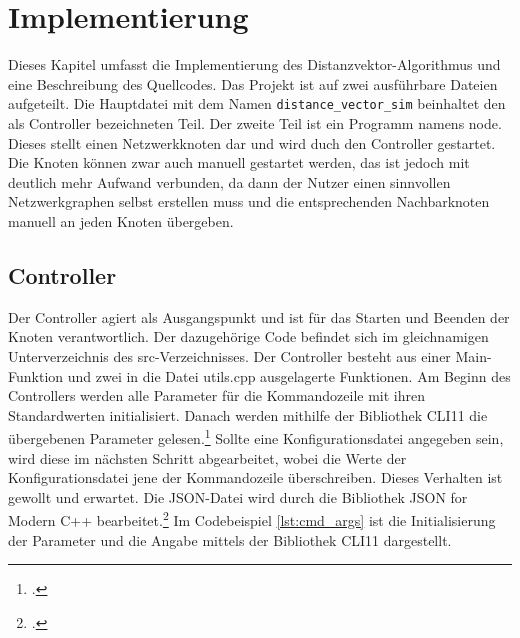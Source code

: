 \chapter{Implementierung}
Dieses Kapitel umfasst die Implementierung des Distanzvektor-Algorithmus und eine Beschreibung des Quellcodes. Das Projekt ist auf zwei ausführbare Dateien aufgeteilt. Die Hauptdatei mit dem Namen \verb|distance_vector_sim| beinhaltet den als Controller bezeichneten Teil. Der zweite Teil ist ein Programm namens node. Dieses stellt einen Netzwerkknoten dar und wird duch den Controller gestartet. Die Knoten können zwar auch manuell gestartet werden, das ist jedoch mit deutlich mehr Aufwand verbunden, da dann der Nutzer einen sinnvollen Netzwerkgraphen selbst erstellen muss und die entsprechenden Nachbarknoten manuell an jeden Knoten übergeben.

\section{Controller}
Der Controller agiert als Ausgangspunkt und ist für das Starten und Beenden der Knoten verantwortlich. Der dazugehörige Code befindet sich im gleichnamigen Unterverzeichnis des src-Verzeichnisses. Der Controller besteht aus einer Main-Funktion und zwei in die Datei utils.cpp ausgelagerte Funktionen. Am Beginn des Controllers werden alle Parameter für die Kommandozeile mit ihren Standardwerten initialisiert. Danach werden mithilfe der Bibliothek CLI11 die übergebenen Parameter gelesen.\footcite{cli} Sollte eine Konfigurationsdatei angegeben sein, wird diese im nächsten Schritt abgearbeitet, wobei die Werte der Konfigurationsdatei jene der Kommandozeile überschreiben. Dieses Verhalten ist gewollt und erwartet. Die JSON-Datei wird durch die Bibliothek JSON for Modern C++ bearbeitet.\footcite{json} Im Codebeispiel \ref{lst:cmd_args} ist die Initialisierung der Parameter und die Angabe mittels der Bibliothek CLI11 dargestellt.

